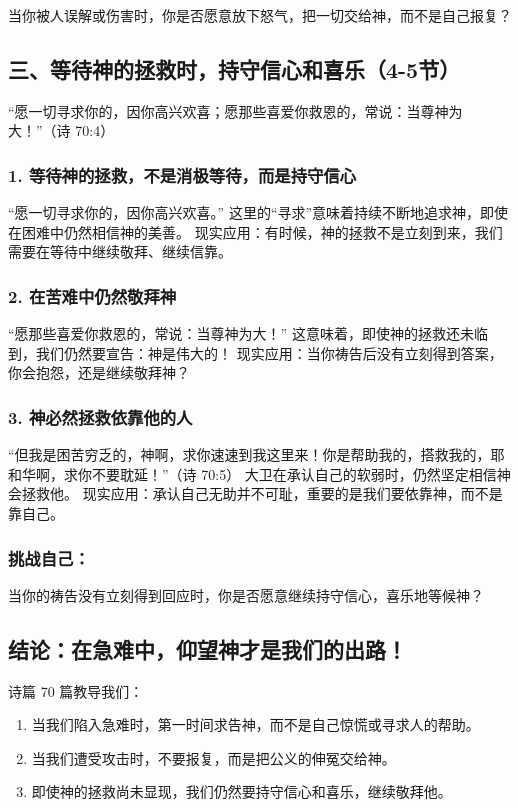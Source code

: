\documentclass[a4paper, 12pt]{article}
\begin{document}
当你被人误解或伤害时，你是否愿意放下怒气，把一切交给神，而不是自己报复？
\subsection*{三、等待神的拯救时，持守信心和喜乐（4-5节）}
“愿一切寻求你的，因你高兴欢喜；愿那些喜爱你救恩的，常说：当尊神为大！”（诗 70:4）

\subsubsection*{1. 等待神的拯救，不是消极等待，而是持守信心}
“愿一切寻求你的，因你高兴欢喜。”
这里的“寻求”意味着持续不断地追求神，即使在困难中仍然相信神的美善。
现实应用：有时候，神的拯救不是立刻到来，我们需要在等待中继续敬拜、继续信靠。
\subsubsection*{2. 在苦难中仍然敬拜神}
“愿那些喜爱你救恩的，常说：当尊神为大！”
这意味着，即使神的拯救还未临到，我们仍然要宣告：神是伟大的！
现实应用：当你祷告后没有立刻得到答案，你会抱怨，还是继续敬拜神？
\subsubsection*{3. 神必然拯救依靠他的人}
“但我是困苦穷乏的，神啊，求你速速到我这里来！你是帮助我的，搭救我的，耶和华啊，求你不要耽延！”（诗 70:5）
大卫在承认自己的软弱时，仍然坚定相信神会拯救他。
现实应用：承认自己无助并不可耻，重要的是我们要依靠神，而不是靠自己。
\subsubsection*{挑战自己：}

当你的祷告没有立刻得到回应时，你是否愿意继续持守信心，喜乐地等候神？
\subsection*{结论：在急难中，仰望神才是我们的出路！}
诗篇 70 篇教导我们：
\begin{enumerate}
    \item 当我们陷入急难时，第一时间求告神，而不是自己惊慌或寻求人的帮助。

    \item 当我们遭受攻击时，不要报复，而是把公义的伸冤交给神。

    \item 即使神的拯救尚未显现，我们仍然要持守信心和喜乐，继续敬拜他。

\end{enumerate}
\end{document}
